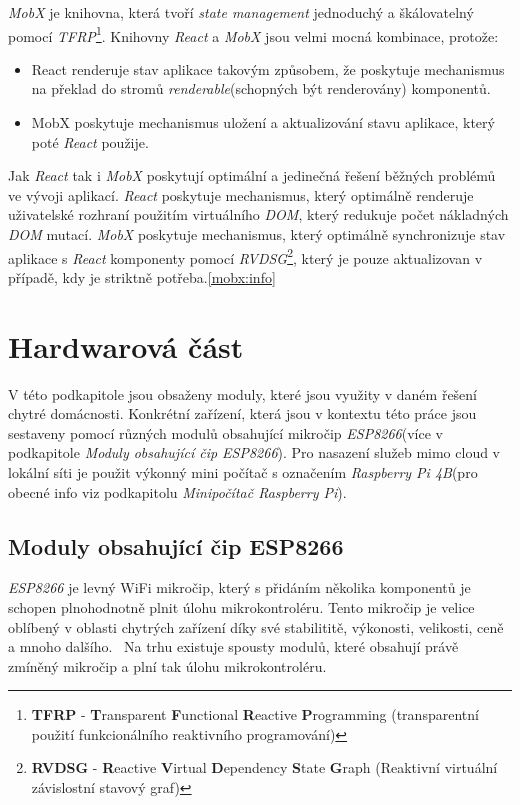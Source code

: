 \emph{MobX} je knihovna, která tvoří \emph{state management} jednoduchý a škálovatelný pomocí \emph{TFRP}\footnote{\textbf{TFRP} - \textbf{T}ransparent \textbf{F}unctional \textbf{R}eactive \textbf{P}rogramming (transparentní použití funkcionálního reaktivního programování)}.
Knihovny \emph{React} a \emph{MobX} jsou velmi mocná kombinace, protože:
\begin{itemize}
  \item React renderuje stav aplikace takovým způsobem, že poskytuje mechanismus na překlad do stromů \emph{renderable}(schopných být renderovány) komponentů.
  \item MobX poskytuje mechanismus uložení a aktualizování stavu aplikace, který poté \emph{React} použije.
\end{itemize}

Jak \emph{React} tak i \emph{MobX} poskytují optimální a jedinečná řešení běžných problémů ve vývoji aplikací.
\emph{React} poskytuje mechanismus, který optimálně renderuje uživatelské rozhraní použitím virtuálního \emph{DOM}, který redukuje počet nákladných \emph{DOM} mutací.
\emph{MobX} poskytuje mechanismus, který optimálně synchronizuje stav aplikace s \emph{React} komponenty pomocí
\emph{RVDSG}\footnote{\textbf{RVDSG} - \textbf{R}eactive \textbf{V}irtual \textbf{D}ependency \textbf{S}tate \textbf{G}raph (Reaktivní virtuální závislostní stavový graf)}, který je pouze aktualizovan v případě, kdy je striktně potřeba.\ref{mobx:info}

\newpage
\section{Hardwarová část}
\label{pouzite:hw}
V této podkapitole jsou obsaženy moduly, které jsou využity v daném řešení chytré domácnosti.
Konkrétní zařízení, která jsou v kontextu této práce jsou sestaveny pomocí různých modulů obsahující mikročip \emph{ESP8266}(více v podkapitole \emph{Moduly obsahující čip ESP8266}).
Pro nasazení služeb mimo cloud v lokální síti je použit výkonný mini počítač s označením \emph{Raspberry Pi 4B}(pro obecné info viz podkapitolu \emph{Minipočítač Raspberry Pi}).

\subsection*{Moduly obsahující čip ESP8266}
\label{terminy:esp8266}

\emph{ESP8266} je levný WiFi mikročip, který s přidáním několika komponentů je schopen plnohodnotně plnit úlohu mikrokontroléru.
Tento mikročip je velice oblíbený v oblasti chytrých zařízení díky své stabilititě, výkonosti, velikosti, ceně a mnoho dalšího.~\cite{wiki:esp}
Na trhu existuje spousty modulů, které obsahují právě zmíněný mikročip a plní tak úlohu mikrokontroléru.

